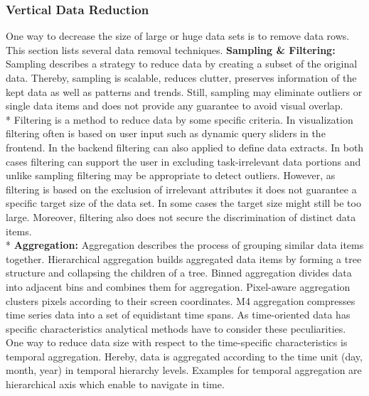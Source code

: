 \subsubsection{Vertical Data Reduction}
One way to decrease the size of large or huge data sets is to remove data rows. This section lists several data removal techniques. 
\textbf{Sampling \& Filtering: }\label{sampling}\label{filtering}
Sampling describes a strategy to reduce data by creating a subset of the original data. Thereby, sampling is scalable, reduces clutter, preserves information of the kept data as well as patterns and trends\cite{PiringerHarald2011}. Still, sampling may eliminate outliers or single data items and does not provide any guarantee to avoid visual overlap. \\*
Filtering is a method to reduce data by some specific criteria. In visualization filtering often is based on user input such as dynamic query sliders in the frontend. In the backend filtering can also applied to define data extracts. In both cases filtering can support the user in excluding task-irrelevant data portions and unlike sampling filtering may be appropriate to detect outliers. However, as filtering is based on the exclusion of irrelevant attributes it does not guarantee a specific target size of the data set. In some cases the target size might still be too large. Moreover, filtering also does not secure the discrimination of distinct data items\cite{PiringerHarald2011}.\\*
\textbf{Aggregation: }\label{aggregation}
Aggregation describes the process of grouping similar data items together. Hierarchical aggregation builds aggregated data items by forming a tree structure and collapsing the children of a tree\cite{elmqvist2010hierarchical}. Binned aggregation divides data into adjacent bins and combines them for aggregation\cite{Liu2013}. Pixel-aware aggregation clusters pixels according to their screen coordinates\cite{li2016polyspector}. M4 aggregation compresses time series data into a set of equidistant time spans\cite{jugel2014m4}.
As time-oriented data has specific characteristics analytical methods have to consider these peculiarities. One way to reduce data size with respect to the time-specific characteristics is temporal aggregation. Hereby, data is aggregated according to the time unit (day, month, year) in temporal hierarchy levels. Examples for temporal aggregation are hierarchical axis \cite{Chung2014} which enable to navigate in time. 

